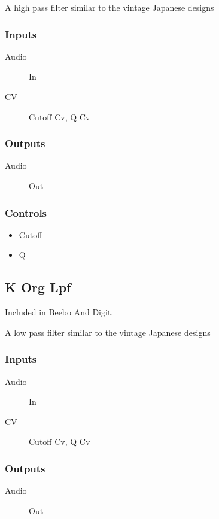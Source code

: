 A high pass filter similar to the vintage Japanese designs



\subsubsection{Inputs}
\begin{description}
\item [Audio] In
\item [CV] Cutoff Cv, Q Cv
\end{description}

\subsubsection{Outputs}
\begin{description}
\item [Audio] Out
\end{description}

\subsubsection{Controls}
\begin{itemize}
\item Cutoff
\item Q
\end{itemize}

\subsection{K Org Lpf}

Included in Beebo And Digit.

A low pass filter similar to the vintage Japanese designs



\subsubsection{Inputs}
\begin{description}
\item [Audio] In
\item [CV] Cutoff Cv, Q Cv
\end{description}

\subsubsection{Outputs}
\begin{description}
\item [Audio] Out
\end{description}

